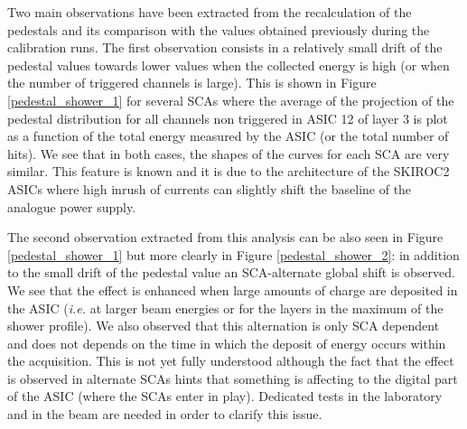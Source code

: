 \documentclass[final,3p,times,twocolumn]{elsarticle}
\begin{document}
Two main observations have been extracted from the recalculation of the pedestals and its comparison
with the values obtained previously during the calibration runs. The first observation
consists in a relatively small 
drift of the pedestal values
towards lower values when the collected energy is high (or when the number of triggered channels is large).
This is shown in Figure \ref{pedestal_shower_1} for several SCAs where the
average of the projection of the pedestal distribution for all channels non triggered in ASIC 12 of layer 3 
is plot as a function of the total energy measured by the ASIC (or the total number of hits).
We see that in both cases, the shapes of the curves 
for each SCA are very similar.
This feature is known and it is due to the architecture of the SKIROC2 ASICs 
where high inrush of currents can slightly shift the baseline of the analogue power supply. 

The second observation extracted from this analysis can be also seen in Figure \ref{pedestal_shower_1} but
more clearly in Figure \ref{pedestal_shower_2}: in addition
to the small drift of the pedestal value an SCA-alternate global shift
is observed. We see that the effect is enhanced when large amounts of charge
are deposited in the ASIC ({\it i.e.} at larger beam energies or for the layers in the maximum of the shower
profile). We also observed that this alternation is only SCA dependent and does not depends
on the time in which the deposit of energy occurs within the acquisition.
This is not yet fully understood although the fact that the effect is observed in
alternate SCAs hints that something is affecting to the digital part of the ASIC 
(where the SCAs enter in play).
Dedicated tests in the laboratory and in the beam are needed in order to clarify this issue.
\end{document}
